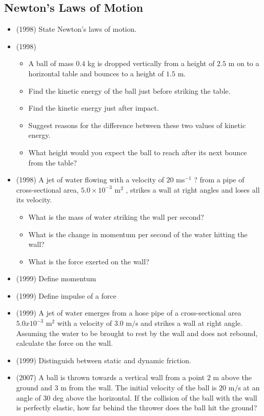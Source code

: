 \documentclass{article}
\begin{document}
\subsection{Newton’s Laws of Motion}
\begin{itemize}
\item (1998)  State Newton's laws of motion.
\item (1998)  \begin{itemize}
\item A ball of mass $ 0.4$ kg is dropped vertically from a height of $ 2.5$ m on to a horizontal table and bounces to a height of $ 1.5$ m.
\item Find the kinetic energy of the ball just before striking the table.
\item Find the kinetic energy just after impact.
\item Suggest reasons for the difference between these two values of kinetic energy.
\item What height would you expect the ball to reach after its next bounce from the table?
\end{itemize}
\item (1998)  A jet of water flowing with a velocity of $ 20$ ms$ ^{-1}$ ? from a pipe of cross-sectional area, $ 5.0 \times 10^{-3}$ m$ ^{2}$ , strikes a wall at right angles and loses all its velocity.\begin{itemize}
\item What is the mass of water striking the wall per second?
\item What is the change in momentum per second of the water hitting the wall?
\item What is the force exerted on the wall?
\end{itemize}
\item (1999)  Define momentum
\item (1999)  Define impulse of a force
\item (1999)  A jet of water emerges from a hose pipe of a cross-sectional area $ 5.0x10^{-3}$ m​$ ^{2}$ with a velocity of $ 3.0$ m$/$s and strikes a wall at right angle. Assuming the water to be brought to rest by the wall and does not rebound, calculate the force on the wall.
\item (1999)  Distinguish between static and dynamic friction.
\item (2007)  A ball is thrown towards a vertical wall from a point $ 2$ m above the ground and $ 3$ m from the wall.  The initial velocity of the ball is $ 20$ m$/$s at an angle of $ 30$ deg above the horizontal.  If the collision of the ball with the wall is perfectly elastic, how far behind the thrower does the ball hit the ground?

\end{itemize}
\end{document}

